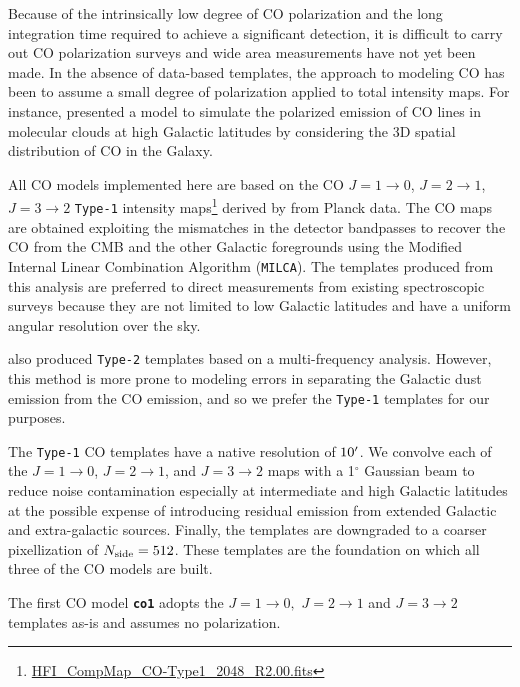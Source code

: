 \documentclass[twocolumn]{aastex631}
\begin{document}
Because of the intrinsically low degree of CO polarization and the long integration time required to achieve a significant detection, it is difficult to carry out CO polarization surveys and wide area measurements have not yet been made. In the absence of data-based templates, the approach to modeling CO has been to assume a small degree of polarization applied to total intensity maps. For instance, \citet{Puglisi:2017} presented a model to simulate the polarized emission of CO lines in molecular clouds at high Galactic latitudes by considering the 3D spatial distribution of CO in the Galaxy. %

All CO models implemented here are based on the CO $J = 1\rightarrow0$, $J = 2\rightarrow1$, $J = 3\rightarrow2$ \texttt{Type-1} intensity maps\footnote{\url{HFI_CompMap_CO-Type1_2048_R2.00.fits}} derived by \citet{planck2013-p03a} from Planck data. The CO maps are obtained exploiting the mismatches in the detector bandpasses to recover the CO from the CMB and the other Galactic foregrounds using the Modified Internal Linear Combination Algorithm (\texttt{MILCA}). The templates produced from this analysis are preferred to direct measurements from existing spectroscopic surveys \citep[e.g.,][]{Dame:2001} because they are not limited to low Galactic latitudes and have a uniform angular resolution over the sky.

\citet{planck2013-p03a} also produced \texttt{Type-2} templates based on a multi-frequency analysis. However, this method is more prone to modeling errors in separating the Galactic dust emission from the CO emission, and so we prefer the \texttt{Type-1} templates for our purposes.

The \texttt{Type-1} CO templates have a native resolution of $10\mbox{$^\prime$}$. We convolve each of the $J = 1\rightarrow0$, $J = 2\rightarrow1$, and $J = 3\rightarrow2$ maps with a 1$^\circ$ Gaussian beam to reduce noise contamination especially at intermediate and high Galactic latitudes at the possible expense of introducing residual emission from extended Galactic and extra-galactic sources. Finally, the templates are downgraded to a coarser pixellization of $N_{\rm side} = 512$. These templates are the foundation on which all three of the CO models are built.

The first CO model {\bf\texttt{co1}} adopts the $J = 1\rightarrow0,$  $J = 2\rightarrow1$ and $J = 3\rightarrow2$ templates as-is and assumes no polarization. 
\end{document}
